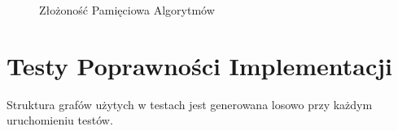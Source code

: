 \documentclass[12pt, a4paper]{article}
\begin{document}
\begin{figure}[H]
  \begin{center}
  \end{center}
  \caption{Złożoność Pamięciowa Algorytmów}
  \label{fig:memory-complexity}
\end{figure}

\section{Testy Poprawności Implementacji}
Struktura grafów użytych w testach jest generowana losowo przy każdym uruchomieniu testów.
\end{document}
